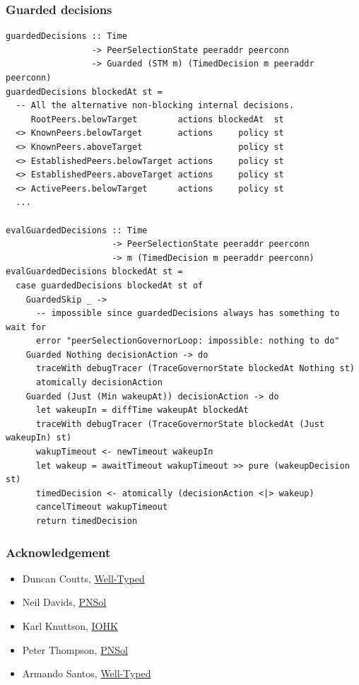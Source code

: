 \documentclass[t,dvipsnames,hyperref={colorlinks,citecolor=NavyBlue,linkcolor=NavyBlue,anchorcolor=NavyBlue,urlcolor=NavyBlue}]{beamer}
\begin{document}
\begin{frame}[fragile]
  \frametitle{Guarded decisions}
  \begin{verbatim}
guardedDecisions :: Time
                 -> PeerSelectionState peeraddr peerconn
                 -> Guarded (STM m) (TimedDecision m peeraddr peerconn)
guardedDecisions blockedAt st =
  -- All the alternative non-blocking internal decisions.
     RootPeers.belowTarget        actions blockedAt  st
  <> KnownPeers.belowTarget       actions     policy st
  <> KnownPeers.aboveTarget                   policy st
  <> EstablishedPeers.belowTarget actions     policy st
  <> EstablishedPeers.aboveTarget actions     policy st
  <> ActivePeers.belowTarget      actions     policy st
  ...

evalGuardedDecisions :: Time
                     -> PeerSelectionState peeraddr peerconn
                     -> m (TimedDecision m peeraddr peerconn)
evalGuardedDecisions blockedAt st =
  case guardedDecisions blockedAt st of
    GuardedSkip _ ->
      -- impossible since guardedDecisions always has something to wait for
      error "peerSelectionGovernorLoop: impossible: nothing to do"
    Guarded Nothing decisionAction -> do
      traceWith debugTracer (TraceGovernorState blockedAt Nothing st)
      atomically decisionAction
    Guarded (Just (Min wakeupAt)) decisionAction -> do
      let wakeupIn = diffTime wakeupAt blockedAt
      traceWith debugTracer (TraceGovernorState blockedAt (Just wakeupIn) st)
      wakupTimeout <- newTimeout wakeupIn
      let wakeup = awaitTimeout wakupTimeout >> pure (wakeupDecision st)
      timedDecision <- atomically (decisionAction <|> wakeup)
      cancelTimeout wakupTimeout
      return timedDecision
  \end{verbatim}

\end{frame}


\begin{frame}
  \frametitle{Acknowledgement}
  \vspace{1cm}
  \begin{itemize}
    \item Duncan Coutts, \href{https://well-typed.com}{Well-Typed}
    \item Neil Davids, \href{http://pnsol.com}{PNSol}
    \item Karl Knuttson, \href{https://iohk.io}{IOHK}
    \item Peter Thompson, \href{http://pnsol.com}{PNSol}
    \item Armando Santos, \href{https://well-typed.com}{Well-Typed}
  \end{itemize}
\end{frame}
\end{document}
